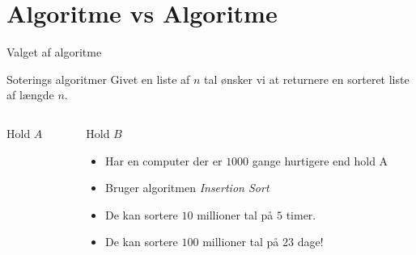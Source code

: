 \documentclass[12pt,t]{beamer}
\begin{document}
\section{Algoritme vs Algoritme}
    \begin{frame}[t]{Valget af algoritme}
        \begin{exampleblock}{Soterings algoritmer}
            Givet en liste af $n$ tal ønsker vi at returnere en sorteret liste
            af længde $n$.
        \end{exampleblock}
        \pause
        \vspace{-2em}
        \begin{columns}
            \begin{column}{0.5\textwidth}
                \begin{block}{Hold $A$}
                    \begin{itemize}
                    \end{itemize}
                \end{block}
            \end{column}
            \begin{column}{0.5\textwidth}
                \begin{block}{Hold $B$}
                    \begin{itemize}[<+->]
                    \item Har en computer der er $1000$ gange hurtigere end
                    hold A
                    \item Bruger algoritmen \emph{Insertion Sort}
                    \item De kan sortere $10$ millioner tal på $5$ timer.
                    \item De kan sortere $100$ millioner tal på \alert{23 dage!}
                    \end{itemize}
                \end{block}
            \end{column}
        \end{columns}
    \end{frame}
\end{document}
